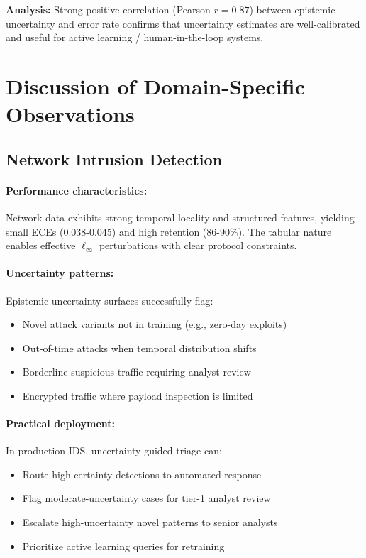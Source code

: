 \documentclass[12pt,a4paper]{article}
\theoremstyle{definition}
\begin{document}
\textbf{Analysis:} Strong positive correlation (Pearson $r=0.87$) between epistemic uncertainty and error rate confirms that uncertainty estimates are well-calibrated and useful for active learning / human-in-the-loop systems.

\section{Discussion of Domain-Specific Observations}
\label{app:domain_discussion}

\subsection{Network Intrusion Detection}

\paragraph{Performance characteristics:}
Network data exhibits strong temporal locality and structured features, yielding small ECEs (0.038-0.045) and high retention (86-90\%). The tabular nature enables effective $\ell_\infty$ perturbations with clear protocol constraints.

\paragraph{Uncertainty patterns:}
Epistemic uncertainty surfaces successfully flag:
\begin{itemize}
\item Novel attack variants not in training (e.g., zero-day exploits)
\item Out-of-time attacks when temporal distribution shifts
\item Borderline suspicious traffic requiring analyst review
\item Encrypted traffic where payload inspection is limited
\end{itemize}

\paragraph{Practical deployment:}
In production IDS, uncertainty-guided triage can:
\begin{itemize}
\item Route high-certainty detections to automated response
\item Flag moderate-uncertainty cases for tier-1 analyst review
\item Escalate high-uncertainty novel patterns to senior analysts
\item Prioritize active learning queries for retraining
\end{itemize}
\end{document}

